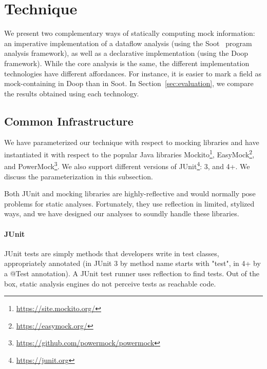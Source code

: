 \section{Technique}
\label{sec:technique}

We present two complementary ways of statically computing mock information: an imperative implementation of a dataflow analysis (using the Soot~\cite{Vallee-Rai:1999:SJB:781995.782008} program analysis framework), as well as a declarative implementation (using the Doop~\cite{conf/oopsla/BravenboerS09} framework). While the core analysis is the same, the different implementation technologies have different affordances. For instance, it is easier to mark a field as mock-containing in Doop than in Soot. In Section~\ref{sec:evaluation}, we compare the results obtained using each technology.

\subsection{Common Infrastructure}
We have parameterized our technique with respect to mocking libraries and have instantiated it with respect to the popular Java libraries Mockito\footnote{\url{https://site.mockito.org/}}, EasyMock\footnote{\url{https://easymock.org/}}, and PowerMock\footnote{\url{https://github.com/powermock/powermock}}. We also support different versions of JUnit\footnote{\url{https://junit.org}}: 3, and 4+. We discuss the parameterization in this subsection.

Both JUnit and mocking libraries are highly-reflective and would normally pose problems for static analyses. Fortunately, they use reflection in limited, stylized ways, and we have designed our analyses to soundly handle these libraries.

\paragraph{JUnit}
JUnit tests are simply methods that developers write in test classes, appropriately annotated (in JUnit 3 by method name starts with "test", in 4+ by a @Test annotation). A JUnit test runner uses reflection to find tests. Out of the box, static analysis engines do not perceive tests as reachable code.


